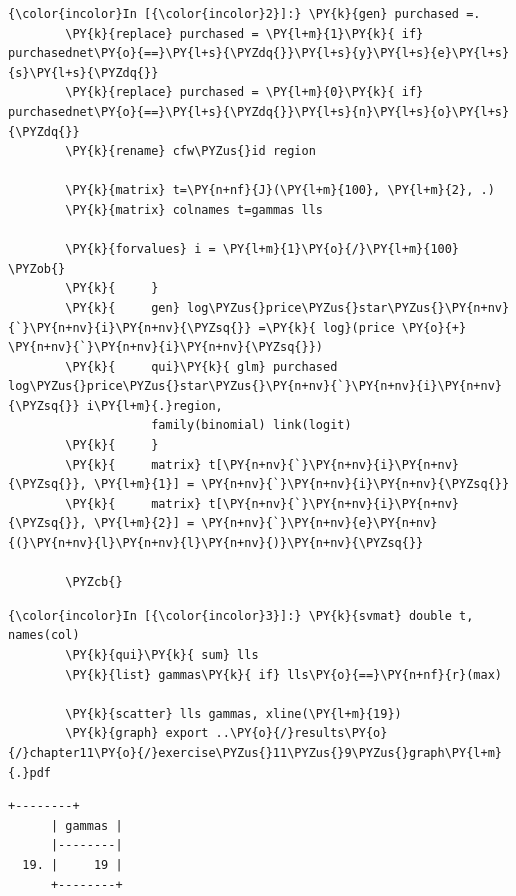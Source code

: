 \documentclass[11pt,notitlepage]{article}\usepackage[]{graphicx}\usepackage[]{color}
\makeatletter
\newenvironment{kframe}{%
 \def\at@end@of@kframe{}%
 \ifinner\ifhmode%
  \def\at@end@of@kframe{\end{minipage}}%
  \begin{minipage}{\columnwidth}%
 \fi\fi%
 \def\FrameCommand##1{\hskip\@totalleftmargin \hskip-\fboxsep
 \colorbox{shadecolor}{##1}\hskip-\fboxsep
     \hskip-\linewidth \hskip-\@totalleftmargin \hskip\columnwidth}%
 \MakeFramed {\advance\hsize-\width
   \@totalleftmargin\z@ \linewidth\hsize
   \@setminipage}}%
 {\par\unskip\endMakeFramed%
 \at@end@of@kframe}
\newenvironment{knitrout}{}{} %
\makeatother
\begin{document}
\begin{enumerate}[a)]
\begin{knitrout}
\begin{kframe}
    \begin{Verbatim}[commandchars=\\\{\}]
{\color{incolor}In [{\color{incolor}2}]:} \PY{k}{gen} purchased =.
        \PY{k}{replace} purchased = \PY{l+m}{1}\PY{k}{ if} purchasednet\PY{o}{==}\PY{l+s}{\PYZdq{}}\PY{l+s}{y}\PY{l+s}{e}\PY{l+s}{s}\PY{l+s}{\PYZdq{}}
        \PY{k}{replace} purchased = \PY{l+m}{0}\PY{k}{ if} purchasednet\PY{o}{==}\PY{l+s}{\PYZdq{}}\PY{l+s}{n}\PY{l+s}{o}\PY{l+s}{\PYZdq{}}    
        \PY{k}{rename} cfw\PYZus{}id region		
            
        \PY{k}{matrix} t=\PY{n+nf}{J}(\PY{l+m}{100}, \PY{l+m}{2}, .)
        \PY{k}{matrix} colnames t=gammas lls
            
        \PY{k}{forvalues} i = \PY{l+m}{1}\PY{o}{/}\PY{l+m}{100} \PYZob{}
        \PY{k}{		}
        \PY{k}{		gen} log\PYZus{}price\PYZus{}star\PYZus{}\PY{n+nv}{`}\PY{n+nv}{i}\PY{n+nv}{\PYZsq{}} =\PY{k}{ log}(price \PY{o}{+} \PY{n+nv}{`}\PY{n+nv}{i}\PY{n+nv}{\PYZsq{}})
        \PY{k}{		qui}\PY{k}{ glm} purchased log\PYZus{}price\PYZus{}star\PYZus{}\PY{n+nv}{`}\PY{n+nv}{i}\PY{n+nv}{\PYZsq{}} i\PY{l+m}{.}region, 
        			family(binomial) link(logit)
        \PY{k}{		}
        \PY{k}{		matrix} t[\PY{n+nv}{`}\PY{n+nv}{i}\PY{n+nv}{\PYZsq{}}, \PY{l+m}{1}] = \PY{n+nv}{`}\PY{n+nv}{i}\PY{n+nv}{\PYZsq{}}
        \PY{k}{		matrix} t[\PY{n+nv}{`}\PY{n+nv}{i}\PY{n+nv}{\PYZsq{}}, \PY{l+m}{2}] = \PY{n+nv}{`}\PY{n+nv}{e}\PY{n+nv}{(}\PY{n+nv}{l}\PY{n+nv}{l}\PY{n+nv}{)}\PY{n+nv}{\PYZsq{}}
        
        \PYZcb{}
\end{Verbatim}

    \begin{Verbatim}[commandchars=\\\{\}]
{\color{incolor}In [{\color{incolor}3}]:} \PY{k}{svmat} double t, names(col)     
        \PY{k}{qui}\PY{k}{ sum} lls
        \PY{k}{list} gammas\PY{k}{ if} lls\PY{o}{==}\PY{n+nf}{r}(max)
           
        \PY{k}{scatter} lls gammas, xline(\PY{l+m}{19})
        \PY{k}{graph} export ..\PY{o}{/}results\PY{o}{/}chapter11\PY{o}{/}exercise\PYZus{}11\PYZus{}9\PYZus{}graph\PY{l+m}{.}pdf
\end{Verbatim}

    \begin{Verbatim}[commandchars=\\\{\}]
      +--------+
      | gammas |
      |--------|
  19. |     19 |
      +--------+

    \end{Verbatim}
\end{kframe}


\end{knitrout}
\end{enumerate}
\end{document}
